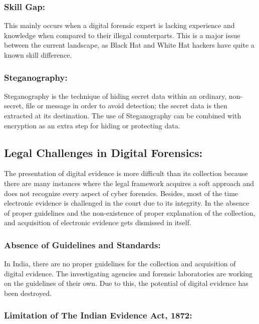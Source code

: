 \documentclass[british]{article}
\begin{document}
\subsubsection{Skill Gap:}

This mainly occurs when a digital forensic expert is lacking experience
and knowledge when compared to their illegal counterparts. This is
a major issue between the current landscape, as Black Hat and White
Hat hackers have quite a known skill difference.

\subsubsection{Steganography:}

Steganography is the technique of hiding secret data within an ordinary,
non-secret, file or message in order to avoid detection; the secret
data is then extracted at its destination. The use of Steganography
can be combined with encryption as an extra step for hiding or protecting
data.

\subsection{Legal Challenges in Digital Forensics:}

The presentation of digital evidence is more difficult than its collection
because there are many instances where the legal framework acquires
a soft approach and does not recognize every aspect of cyber forensics.
Besides, most of the time electronic evidence is challenged in the
court due to its integrity. In the absence of proper guidelines and
the non-existence of proper explanation of the collection, and acquisition
of electronic evidence gets dismissed in itself.

\subsubsection{Absence of Guidelines and Standards:}

In India, there are no proper guidelines for the collection and acquisition
of digital evidence. The investigating agencies and forensic laboratories
are working on the guidelines of their own. Due to this, the potential
of digital evidence has been destroyed. 

\subsubsection{Limitation of The Indian Evidence Act, 1872:}
\end{document}
